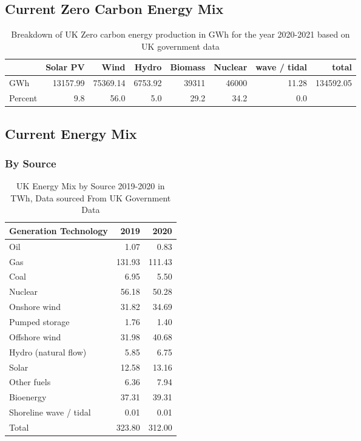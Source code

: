 \documentclass[11pt]{article}
\numberwithin{equation}{section}
\begin{document}
\subsection{Current Zero Carbon Energy Mix}
\label{sec:org5191717}
\begin{table}[H]
\caption{\label{tabUkGreenEnergy2020}Breakdown of UK Zero carbon energy production in GWh for the year 2020-2021 based on UK government data \cite{RenewableElecricityCap}}
\centering
\begin{tabular}{lrrrrrrr}
\toprule
 & Solar PV & Wind & Hydro & Biomass & Nuclear & wave / tidal & total\\
\midrule
GWh & 13157.99 & 75369.14 & 6753.92 & 39311 & 46000 & 11.28 & 134592.05\\
Percent & 9.8 & 56.0 & 5.0 & 29.2 & 34.2 & 0.0 & \\
\bottomrule
\end{tabular}
\end{table}

\subsection{Current Energy Mix \label{secAppCurrentEnergyMix}}
\label{sec:orgd6cb3c1}
\subsubsection{By Source}
\label{sec:org8d2a56f}
\begin{table}[H]
\caption{\label{tabUKEnergyMix2019to20_byFuel}UK Energy Mix by Source 2019-2020 in TWh, Data sourced From UK Government Data\cite{ukEnergyConsumptionAll}}
\centering
\begin{tabular}{lrr}
\toprule
Generation Technology & 2019 & 2020\\
\midrule
Oil & 1.07 & 0.83\\
Gas & 131.93 & 111.43\\
Coal & 6.95 & 5.50\\
Nuclear & 56.18 & 50.28\\
Onshore wind & 31.82 & 34.69\\
Pumped storage & 1.76 & 1.40\\
Offshore wind & 31.98 & 40.68\\
Hydro (natural flow) & 5.85 & 6.75\\
Solar & 12.58 & 13.16\\
Other fuels & 6.36 & 7.94\\
Bioenergy & 37.31 & 39.31\\
Shoreline wave / tidal & 0.01 & 0.01\\
\midrule
Total & 323.80 & 312.00\\
\bottomrule
\end{tabular}
\end{table}
\end{document}
